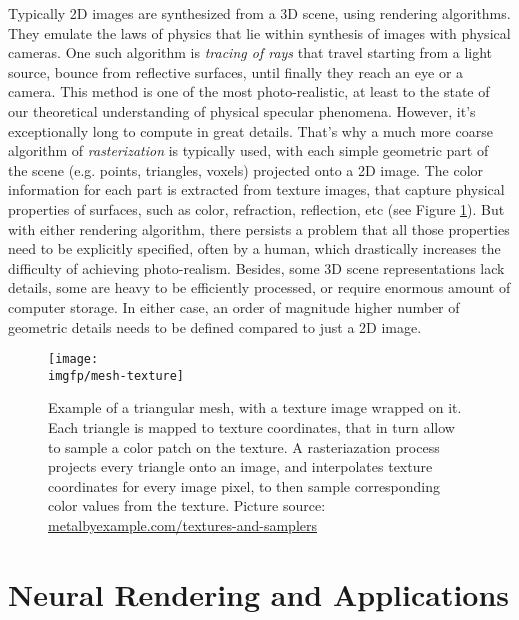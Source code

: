 Typically 2D images are synthesized from a 3D scene, using rendering algorithms. They emulate the laws of physics that lie within synthesis of images with physical cameras. One such algorithm is \textit{tracing of rays} that travel starting from a light source, bounce from reflective surfaces, until finally they reach an eye or a camera. This method is one of the most photo-realistic, at least to the state of our theoretical understanding of physical specular phenomena. However, it's exceptionally long to compute in great details. That's why a much more coarse algorithm of \textit{rasterization} is typically used, with each simple geometric part of the scene (e.g. points, triangles, voxels) projected onto a 2D image. The color information for each part is extracted from texture images, that capture physical properties of surfaces, such as color, refraction, reflection, etc (see Figure \ref{intro:fig:mesh-texture}). But with either rendering algorithm, there persists a problem that all those properties need to be explicitly specified, often by a human, which drastically increases the difficulty of achieving photo-realism. Besides, some 3D scene representations lack details, some are heavy to be efficiently processed, or require enormous amount of computer storage. In either case, an order of magnitude higher number of geometric details needs to be defined compared to just a 2D image. 

\begin{figure}[h!]
	\centering
	\texttt{[image: \\imgfp/mesh-texture]}
	\caption{Example of a triangular mesh, with a texture image wrapped on it. Each triangle is mapped to texture coordinates, that in turn allow to sample a color patch on the texture. A rasteriazation process projects every triangle onto an image, and interpolates texture coordinates for every image pixel, to then sample corresponding color values from the texture. Picture source: \href{https://metalbyexample.com/textures-and-samplers/}{metalbyexample.com/textures-and-samplers}}
	\label{intro:fig:mesh-texture}
\end{figure}


\section{Neural Rendering and Applications}\label{intro:nrender}

